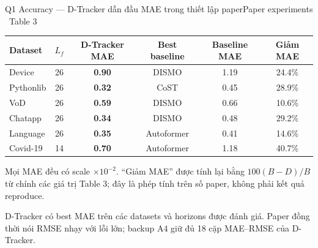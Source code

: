 \documentclass[aspectratio=169,11pt]{beamer}
\begin{document}
\begin{frame}[shrink=30]{Q1 Accuracy --- D-Tracker dẫn đầu MAE trong thiết lập paper}{Paper experiments \textperiodcentered\ Table 3}
\centering
{\small
\begin{tabular}{@{}lccccc@{}}
  \toprule
  Dataset & $L_f$ & D-Tracker MAE & Best baseline & Baseline MAE & Giảm MAE\\
  \midrule
  Device & 26 & \textbf{0.90} & DISMO & 1.19 & 24.4\%\\
  Pythonlib & 26 & \textbf{0.32} & CoST & 0.45 & 28.9\%\\
  VoD & 26 & \textbf{0.59} & DISMO & 0.66 & 10.6\%\\
  Chatapp & 26 & \textbf{0.34} & DISMO & 0.48 & 29.2\%\\
  Language & 26 & \textbf{0.35} & Autoformer & 0.41 & 14.6\%\\
  Covid-19 & 14 & \textbf{0.70} & Autoformer & 1.18 & 40.7\%\\
  \bottomrule
\end{tabular}}
\vspace{3mm}
\begin{intuition}
  Mọi MAE đều có scale \textbf{$\times10^{-2}$}. “Giảm MAE” được tính lại bằng $100(B-D)/B$ từ chính các giá trị Table 3; đây là phép tính trên số paper, không phải kết quả reproduce.
\end{intuition}
\vspace{3mm}
\begin{takeaway}
  D-Tracker có best MAE trên các datasets và horizons được đánh giá. Paper đồng thời nói RMSE nhạy với lỗi lớn; backup A4 giữ đủ 18 cặp MAE--RMSE của D-Tracker.
\end{takeaway}
\vspace{2mm}
\end{frame}
\end{document}
